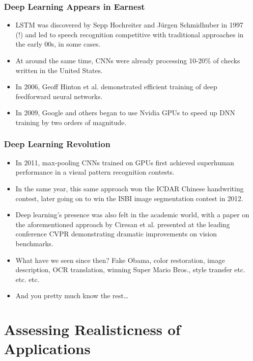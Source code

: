 \documentclass[10pt]{beamer}
\begin{document}
  \begin{frame}
    \frametitle{Deep Learning Appears in Earnest}

    \begin{itemize}
      \item LSTM was discovered by Sepp Hochreiter and Jürgen Schmidhuber in
        1997 (!) and led to speech recognition competitive with traditional
        approaches in the early 00s, in some cases.
      \pause
      \item At around the same time, CNNs were already processing 10-20\% of
        checks written in the United States.
      \pause
      \item In 2006, Geoff Hinton et al. demonstrated efficient training of
        deep feedforward neural networks.
      \pause
      \item In 2009, Google and others began to use Nvidia GPUs to speed up
        DNN training by two orders of magnitude.
    \end{itemize}
  \end{frame}

  \begin{frame}
    \frametitle{Deep Learning Revolution}

    \begin{itemize}
      \item In 2011, max-pooling CNNs trained on GPUs first achieved
        superhuman performance in a visual pattern recognition contests.
      \pause
      \item In the same year, this same approach won the ICDAR Chinese
        handwriting contest, later going on to win the ISBI image segmentation
        contest in 2012.
      \pause
      \item Deep learning's presence was also felt in the academic world, with
        a paper on the aforementioned approach by Ciresan et al. presented at
        the leading conference CVPR demonstrating dramatic improvements on
        vision benchmarks.
      \pause
      \item What have we seen since then? Fake Obama, color restoration, image
        description, OCR translation, winning Super Mario Bros., style
        transfer etc. etc. etc.
      \pause
      \item And you pretty much know the rest\ldots
    \end{itemize}
  \end{frame}

  \section{Assessing Realisticness of Applications}
\end{document}
